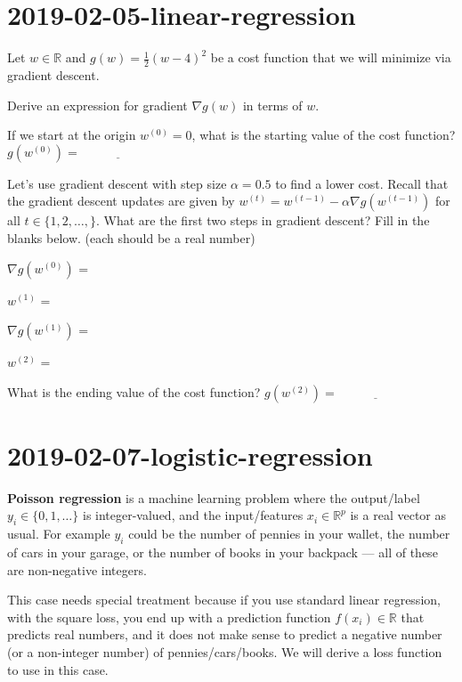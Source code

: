 \documentclass{article}
\begin{document}
\newpage
\section{2019-02-05-linear-regression}
Let $w\in\mathbb R$ and $g(w) = \frac 1 2 (w-4)^2$ be a cost function
that we will minimize via gradient descent.

Derive an expression for gradient $\nabla g(w)$ in terms of $w$.

\vskip 1in 

If we start at the origin $w^{(0)}=0$, what is the starting value of the
cost function? $g(w^{(0)})=\underline{\hspace{1in}}$ 

Let's use gradient descent with step size $\alpha=0.5$ to find a lower
cost. Recall that the gradient descent updates are given by
$w^{(t)}=w^{(t-1)} - \alpha\nabla g(w^{(t-1)})$ for all
$t\in\{1, 2, \dots, \}$. What are the first two steps in gradient
descent? Fill in the blanks below. (each should be a real number)

$\nabla g(w^{(0)})$ = \underline{\hspace{1in}}

\vskip 1in

$ w^{(1)}$ = \underline{\hspace{1in}}

\vskip 1in

$\nabla g(w^{(1)})$ = \underline{\hspace{1in}}

\vskip 1in

$ w^{(2)}$ = \underline{\hspace{1in}}

\vskip 1in

What is the ending value of the cost function?
$g(w^{(2)})=\underline{\hspace{1in}}$

\newpage
\section{2019-02-07-logistic-regression}
\textbf{Poisson regression} is a  machine learning problem
where the output/label $y_i\in\{0,1, \dots \}$ is integer-valued, and
the input/features $x_i\in\mathbb R^p$ is a real vector as usual. For
example $y_i$ could be the number of pennies in your wallet, the
number of cars in your garage, or the number of books in your backpack
--- all of these are non-negative integers.

This case needs special treatment because if you use standard linear
regression, with the square loss, you end up with a prediction
function $f(x_i)\in\mathbb R$ that predicts real numbers, and it does
not make sense to predict a negative number (or a non-integer number)
of pennies/cars/books. We will derive a loss function to use in this case.
\end{document}
